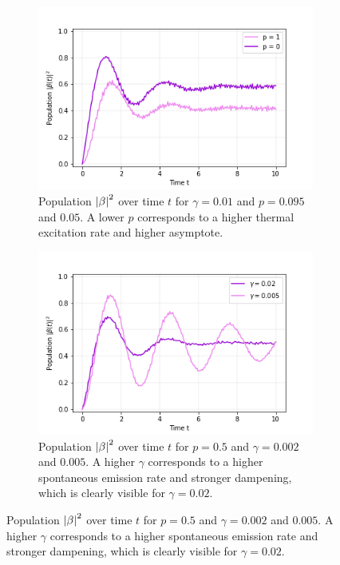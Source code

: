 \begin{figure}[h]
    \centering
    \caption{Trotterized Rabi oscillation with GAD for varying $p$ and $\gamma$. The time step is still $\delta t = 0.05$.}
    \addtocounter{figure}{-1}
    \begin{subfigure}[t]{0.48\textwidth}
        \includegraphics[width=\textwidth]{tex/figures/exercise07_02.png}
        \caption{Population $\left|\beta\right|^2$ over time $t$ for $\gamma = 0.01$ and $p = 0.095$ and $0.05$. A lower $p$ corresponds to a higher thermal excitation rate and higher asymptote.}
        \label{fig:exercise07_02}
    \end{subfigure}
    \begin{subfigure}[t]{0.48\textwidth}
        \includegraphics[width=\textwidth]{tex/figures/exercise07_03.png}
        \caption{Population $\left|\beta\right|^2$ over time $t$ for $p = 0.5$ and $\gamma = 0.002$ and $0.005$. A higher $\gamma$ corresponds to a higher spontaneous emission rate and stronger dampening, which is clearly visible for $\gamma = 0.02$.}

\end{subfigure}
\end{figure}
